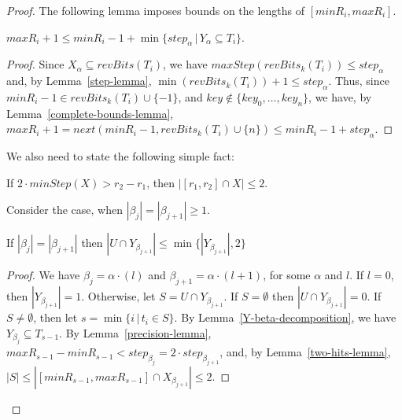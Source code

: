 \documentclass{llncs}
\begin{document}
\begin{proof}
The following lemma imposes bounds on the lengths of $[minR_i,maxR_i]$.
\begin{lemma}\label{precision-lemma}
$maxR_i+1\le minR_i-1+\min \{step_\alpha\,|\, Y_\alpha\subseteq T_i\}$.
\end{lemma}
\begin{proof}
Since $X_\alpha\subseteq revBits(T_i)$,
we have $maxStep(revBits_k(T_i))\le step_\alpha$ and,
by Lemma~\ref{step-lemma},
$\min(revBits_k(T_i))+1\le step_\alpha$.
Thus, since $minR_i-1\in revBits_k(T_i)\cup\{-1\}$,
and  $key\not\in\{key_0,\ldots,key_n\}$,
we have, by Lemma~\ref{complete-bounds-lemma}, 
$maxR_i+1=next(minR_i-1, revBits_k(T_i)\cup \{n\})\le minR_i-1+step_\alpha$.
\end{proof}

We also need to state the following simple fact:
\begin{lemma}\label{two-hits-lemma}
If $2\cdot minStep(X)> r_2-r_1$, 
then 
$|[r_1, r_2]\cap X|\le 2$.
\end{lemma}


Consider the case, when $|\beta_{j}|=|\beta_{j+1}|\ge 1$.
\begin{lemma}\label{next-level-lemma}
If $|\beta_{j}|=|\beta_{j+1}|$ 
then 
$|U\cap Y_{\beta_{j+1}}|\le \min\{|Y_{\beta_{j+1}}|,2\}$
\end{lemma}
 
\begin{proof}
We have $\beta_j=\alpha\cdot (l)$ and $\beta_{j+1}=\alpha\cdot (l+1)$,
for some $\alpha$ and $l$.
If $l=0$, then  $|Y_{\beta_{j+1}}|=1$.
Otherwise, let  $S=U\cap Y_{\beta_{j+1}}$.
If $S=\emptyset$ then $|U\cap Y_{\beta_{j+1}}|=0$.
If $S\not=\emptyset$, then let $s=\min\{i\,|\, t_i\in S\}$.
By Lemma~\ref{Y-beta-decomposition}, we have $Y_{\beta_j}\subseteq T_{s-1}$.
By Lemma~\ref{precision-lemma}, $maxR_{s-1}-minR_{s-1}< step_{\beta_j}=2\cdot step_{\beta_{j+1}}$,
and, by Lemma~\ref{two-hits-lemma},
$|S|\le |[minR_{s-1},maxR_{s-1}]\cap X_{\beta_{j+1}}|\le 2$.
\end{proof}



\end{proof}
\end{document}
